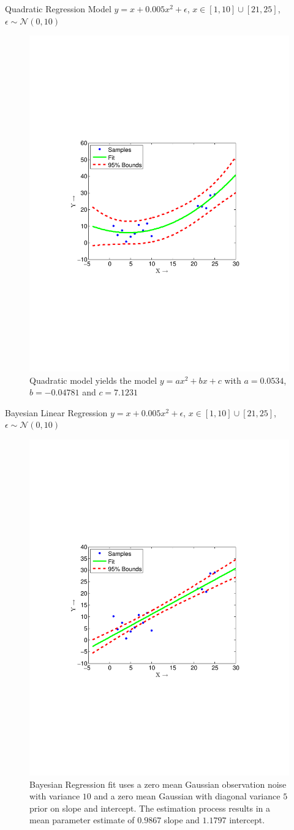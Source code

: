 \begin{frame}{Quadratic Regression Model}
$y = x+0.005x^2+ \epsilon$, $x \in [1,10] \cup [21,25]$,  $\epsilon \sim \mathcal{N}(0,10)$
\begin{figure}
    \centering
\includegraphics[width=0.5\linewidth,trim=30mm 80mm 40mm 70mm,clip]{figures/quadratic_fit}
\caption{ Quadratic model yields the model $y = ax^2+bx+c$ with $a = 0.0534$, $b = -0.04781$ and $c = 7.1231$}
\end{figure}

\end{frame}

\begin{frame}{Bayesian Linear Regression}
$y = x+0.005x^2+ \epsilon$, $x \in [1,10] \cup [21,25]$,  $\epsilon \sim \mathcal{N}(0,10)$ 
\begin{figure}
\centering
\includegraphics[width=0.5\linewidth,trim=30mm 80mm 40mm 70mm,clip]{figures/bayesian_linear_fit}
\caption{ Bayesian Regression fit uses a zero mean Gaussian observation noise with  variance $10$ and a zero mean Gaussian with diagonal variance $5$ prior on slope and intercept. The estimation process results in a mean parameter estimate of $0.9867$ slope and $1.1797$ intercept.}
\end{figure}
\end{frame}

